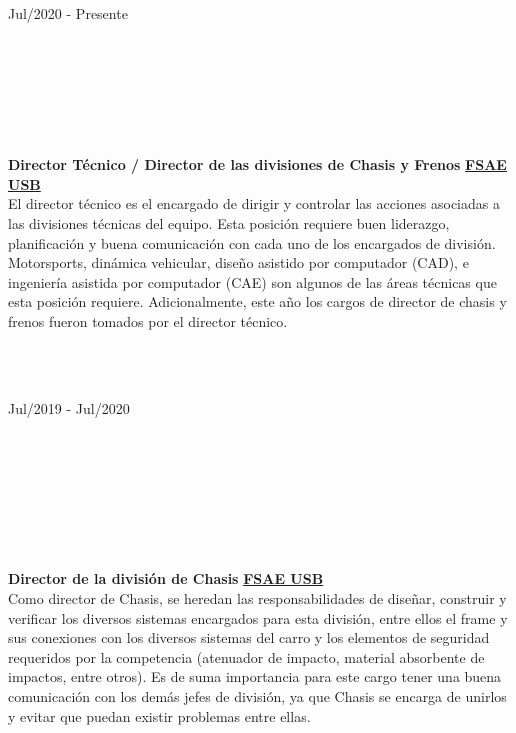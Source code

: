 \documentclass[10pt]{article}
\begin{document}
\begin{vwcol}[widths={0.235,0.765},
 sep=.8cm,rule=0pt,indent=0em,lines=7]
    \hspace{5pt}Jul/2020 - Presente\par
    \hfill\\
    \hfill\\
    \hfill\\
    \hfill\\
    \hfill\\
    \hfill\\
    \textbf{Director Técnico / Director de las divisiones de Chasis y Frenos}
    \hfill
    \href{http://fsaeusb.com.ve/}{\color{blue!50!black}\textbf{FSAE USB}}\\
    \vspace{5pt}
    El director técnico es el encargado de dirigir y controlar las acciones asociadas a las divisiones técnicas del equipo. Esta posición requiere buen liderazgo, planificación y buena comunicación con cada uno de los encargados de división. Motorsports, dinámica vehicular, diseño asistido por computador (CAD), e ingeniería asistida por computador (CAE) son algunos de las áreas técnicas que esta posición requiere. Adicionalmente, este año los cargos de director de chasis y frenos fueron tomados por el director técnico.\par
\end{vwcol}
\clearpage
\hfill\\
\hfill\\

\begin{vwcol}[widths={0.235,0.765},
 sep=.8cm, rule=0pt,indent=0em,lines=8]
    \hspace{5pt}Jul/2019 - Jul/2020\par
    \hfill\\
    \hfill\\
    \hfill\\
    \hfill\\
    \hfill\\
    \hfill\\
    \hfill\\
    \textbf{Director de la división de Chasis}
    \hfill
    \href{http://fsaeusb.com.ve/}{\color{blue!50!black}\textbf{FSAE USB}}\\
    \vspace{5pt}
    Como director de Chasis, se heredan las responsabilidades de diseñar, construir y verificar los diversos sistemas encargados para esta división, entre ellos el frame y sus conexiones con los diversos sistemas del carro y los elementos de seguridad requeridos por la competencia (atenuador de impacto, material absorbente de impactos, entre otros). Es de suma importancia para este cargo tener una buena comunicación con los demás jefes de división, ya que Chasis se encarga de unirlos y evitar que puedan existir problemas entre ellas.\par
\end{vwcol}
\end{document}

